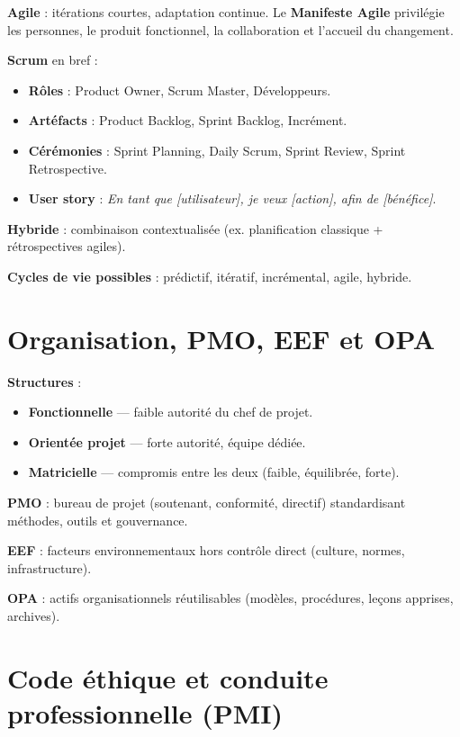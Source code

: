\documentclass[11pt,a4paper]{article}
\begin{document}
\textbf{Agile} : itérations courtes, adaptation continue. Le \textbf{Manifeste Agile} privilégie les personnes, le produit fonctionnel, la collaboration et l'accueil du changement.

\textbf{Scrum} en bref :
\begin{itemize}
    \item \textbf{Rôles} : Product Owner, Scrum Master, Développeurs.
    \item \textbf{Artéfacts} : Product Backlog, Sprint Backlog, Incrément.
    \item \textbf{Cérémonies} : Sprint Planning, Daily Scrum, Sprint Review, Sprint Retrospective.
    \item \textbf{User story} : \textit{En tant que [utilisateur], je veux [action], afin de [bénéfice]}.
\end{itemize}

\textbf{Hybride} : combinaison contextualisée (ex. planification classique + rétrospectives agiles).

\textbf{Cycles de vie possibles} : prédictif, itératif, incrémental, agile, hybride.

\section{Organisation, PMO, EEF et OPA}

\textbf{Structures} :
\begin{itemize}
    \item \textbf{Fonctionnelle} --- faible autorité du chef de projet.
    \item \textbf{Orientée projet} --- forte autorité, équipe dédiée.
    \item \textbf{Matricielle} --- compromis entre les deux (faible, équilibrée, forte).
\end{itemize}

\textbf{PMO} : bureau de projet (soutenant, conformité, directif) standardisant méthodes, outils et gouvernance.

\textbf{EEF} : facteurs environnementaux hors contrôle direct (culture, normes, infrastructure).

\textbf{OPA} : actifs organisationnels réutilisables (modèles, procédures, leçons apprises, archives).

\section{Code éthique et conduite professionnelle (PMI)}
\end{document}
